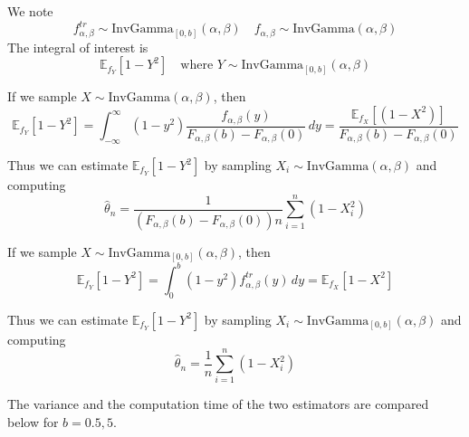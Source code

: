 We note 
        \[f_{\alpha, \beta}^{tr} \sim \text{InvGamma}_{[0, b]}(\alpha, \beta) \quad f_{\alpha, \beta} \sim \text{InvGamma}(\alpha, \beta) \]
        The integral of interest is
        \[\mathbb{E}_{f_Y}\left[ 1 - Y^2 \right] \quad \text{where } Y \sim \text{InvGamma}_{[0, b]}(\alpha, \beta)\]

\begin{answerenum}
    \item If we sample \(X \sim \text{InvGamma}(\alpha, \beta)\), then 
        \[\mathbb{E}_{f_Y}\left[ 1 - Y^2 \right] = \int_{-\infty}^{\infty} (1 - y^2) \frac{f_{\alpha, \beta}(y)}{F_{\alpha, \beta}(b) - F_{\alpha, \beta}(0)} \, dy = \frac{\mathbb{E}_{f_X}\left[ (1 - X^2) \right]}{F_{\alpha, \beta}(b) - F_{\alpha, \beta}(0)} \]

        Thus we can estimate \(\mathbb{E}_{f_Y}\left[ 1 - Y^2 \right]\) by sampling \(X_i \sim \text{InvGamma}(\alpha, \beta)\) and computing
        \[\hat{\theta}_n = \frac{1}{(F_{\alpha, \beta}(b) - F_{\alpha, \beta}(0))n} \sum_{i=1}^n (1 - X_i^2) \]
    \item If we sample \(X \sim \text{InvGamma}_{[0, b]}(\alpha, \beta)\), then
        \[\mathbb{E}_{f_Y}\left[ 1 - Y^2 \right] = \int_0^b (1 - y^2) f_{\alpha, \beta}^{tr}(y) \, dy = \mathbb{E}_{f_X}\left[ 1 - X^2 \right] \]

        Thus we can estimate \(\mathbb{E}_{f_Y}\left[ 1 - Y^2 \right]\) by sampling \(X_i \sim \text{InvGamma}_{[0, b]}(\alpha, \beta)\) and computing
        \[\hat{\theta}_n = \frac{1}{n} \sum_{i=1}^n (1 - X_i^2) \]

    \item The variance and the computation time of the two estimators are compared below for \(b = 0.5, 5\).
\end{answerenum}

